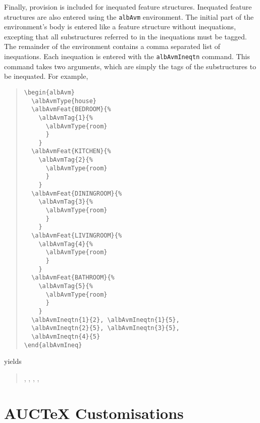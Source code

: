 \documentclass[a4paper,11pt]{article}
\newcommand{\AUCTeX}[0]{AUC\TeX{}}
\begin{document}
Finally, provision is included for inequated feature structures.
Inequated feature structures are also entered using the \texttt{albAvm}
environment.  The initial part of the environment's body is entered like
a feature structure without inequations, excepting that all
substructures referred to in the inequations must be tagged.  The
remainder of the environment contains a comma separated list of
inequations.  Each inequation is entered with the \texttt{albAvmIneqtn}
command.  This command takes two arguments, which are simply the tags of
the substructures to be inequated.  For example,
\begin{quote}
\begin{verbatim}
\begin{albAvm}
  \albAvmType{house}
  \albAvmFeat{BEDROOM}{%
    \albAvmTag{1}{%
      \albAvmType{room}
      }
    }
  \albAvmFeat{KITCHEN}{%
    \albAvmTag{2}{%
      \albAvmType{room}
      }
    }
  \albAvmFeat{DININGROOM}{%
    \albAvmTag{3}{%
      \albAvmType{room}
      }
    }
  \albAvmFeat{LIVINGROOM}{%
    \albAvmTag{4}{%
      \albAvmType{room}
      }
    }
  \albAvmFeat{BATHROOM}{%
    \albAvmTag{5}{%
      \albAvmType{room}
      }
    }
  \albAvmIneqtn{1}{2}, \albAvmIneqtn{1}{5},
  \albAvmIneqtn{2}{5}, \albAvmIneqtn{3}{5},
  \albAvmIneqtn{4}{5}
\end{albAvmIneq}
\end{verbatim}
\end{quote}
yields
\begin{quote}
  \begin{albAvm}
    , ,
    , ,
  \end{albAvm}
\end{quote}
 



\section{\AUCTeX{} Customisations}
\label{sec:avm-examples:auctex-cust}
\end{document}

